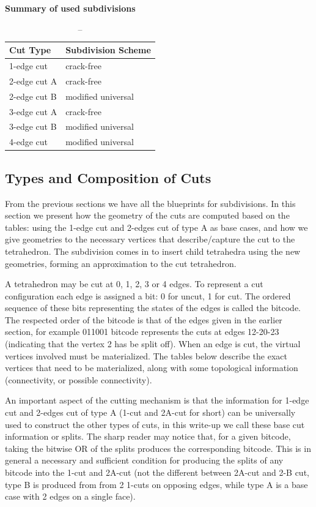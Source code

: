 \textbf{Summary of used subdivisions}\\
\begin{table}[]
\begin{tabular}{|l|l|}
\hline
Cut Type     & Subdivision Scheme \\ \hline
1-edge cut   & crack-free         \\ \hline
2-edge cut A & crack-free         \\ \hline
2-edge cut B & modified universal \\ \hline
3-edge cut A & crack-free         \\ \hline
3-edge cut B & modified universal \\ \hline
4-edge cut   & modified universal \\ \hline
\end{tabular}
\caption{--}
\end{table}


\subsection{Types and Composition of Cuts}
From the previous sections we have all the blueprints for subdivisions. In this section we present how the geometry of the cuts are computed based on the tables: using the 1-edge cut and 2-edges cut of type A as base cases, and how we give geometries to the necessary vertices that describe/capture the cut to the tetrahedron. The subdivision comes in to insert child tetrahedra using the new geometries, forming an approximation to the cut tetrahedron.

A tetrahedron may be cut at 0, 1, 2, 3 or 4 edges. To represent a cut configuration each edge is assigned a bit: 0 for uncut, 1 for cut. The ordered sequence of these bits representing the states of the edges is called the bitcode. The respected order of the bitcode is that of the edges given in the earlier section, for example 011001 bitcode represents the cuts at edges 12-20-23 (indicating that the vertex 2 has be split off). When an edge is cut, the virtual vertices involved must be materialized. The tables below describe the exact vertices that need to be materialized, along with some topological information (connectivity, or possible connectivity).

An important aspect of the cutting mechanism is that the information for 1-edge cut and 2-edges cut of type A (1-cut and 2A-cut for short) can be universally used to construct the other types of cuts, in this write-up we call these base cut information or splits. The sharp reader may notice that, for a given bitcode, taking the bitwise OR of the splits produces the corresponding bitcode. This is in general a necessary and sufficient condition for producing the splits of any bitcode into the 1-cut and 2A-cut (not the different between 2A-cut and 2-B cut, type B is produced from from 2 1-cuts on opposing edges, while type A is a base case with 2 edges on a single face).

